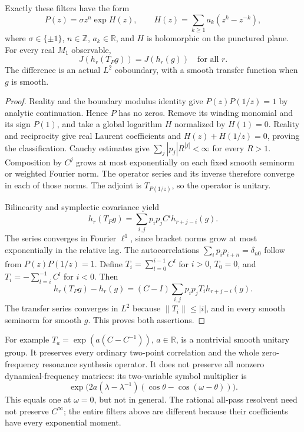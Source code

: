 \begin{theorem}\label{thm:entire-allpass}
Exactly these filters have the form
\[
 P(z)=\sigma z^n\exp H(z),\qquad
 H(z)=\sum_{k\ge1}a_k(z^k-z^{-k}),
\]
where $\sigma\in\{\pm1\}$, $n\in\mathbb Z$, $a_k\in\mathbb R$, and $H$ is
holomorphic on the punctured plane. For every real $M_1$ observable,
\[
 J(h_r(T_Pg))=J(h_r(g))\quad\text{for all }r.
\]
The difference is an actual $L^2$ coboundary, with a smooth transfer function
when $g$ is smooth.
\end{theorem}
\begin{proof}
Reality and the boundary modulus identity give $P(z)P(1/z)=1$ by analytic
continuation. Hence $P$ has no zeros. Remove its winding monomial and its
sign $P(1)$, and take a global logarithm $H$ normalized by $H(1)=0$.
Reality and reciprocity give real Laurent coefficients and
$H(z)+H(1/z)=0$, proving the classification.
Cauchy estimates give $\sum_j|p_j|R^{|j|}<\infty$ for every $R>1$.
Composition by $C^j$ grows at most exponentially on each fixed smooth
seminorm or weighted Fourier norm. The operator series and its inverse
therefore converge in each of those norms. The adjoint is $T_{P(1/z)}$,
so the operator is unitary.

Bilinearity and symplectic covariance yield
\[
 h_r(T_Pg)=\sum_{i,j}p_ip_jC^ih_{r+j-i}(g).
\]
The series converges in Fourier $\ell^1$, since bracket norms grow at most
exponentially in the relative lag. The autocorrelations
$\sum_ip_ip_{i+n}=\delta_{n0}$ follow from $P(z)P(1/z)=1$.
Define $T_i=\sum_{l=0}^{i-1}C^l$ for $i>0$, $T_0=0$, and
$T_i=-\sum_{l=i}^{-1}C^l$ for $i<0$. Then
\[
 h_r(T_Pg)-h_r(g)=(C-I)\sum_{i,j}p_ip_jT_ih_{r+j-i}(g).
\]
The transfer series converges in $L^2$ because $\|T_i\|\le|i|$, and in
every smooth seminorm for smooth $g$. This proves both assertions.
\end{proof}

For example $T_a=\exp(a(C-C^{-1}))$, $a\in\mathbb R$, is a nontrivial smooth
unitary group. It preserves every ordinary two-point correlation and the
whole zero-frequency resonance synthesis operator. It does not preserve all
nonzero dynamical-frequency matrices: its two-variable symbol multiplier is
\[
 \exp\bigl(2a(\lambda-\lambda^{-1})
        (\cos\theta-\cos(\omega-\theta))\bigr).
\]
This equals one at $\omega=0$, but not in general.
The rational all-pass resolvent need not preserve $C^\infty$; the entire
filters above are different because their coefficients have every
exponential moment.

